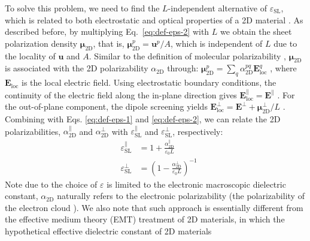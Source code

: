 \documentclass[journal=ancac3,manuscript=article,email=true,hyperref=true,keywords=false]{achemso}
\begin{document}
To solve this problem, we need to find the $L$-independent alternative
of $\varepsilon_{\mathrm{SL}}$, which is related to both electrostatic
and optical properties of a 2D material \cite{Matthes_2016}. As
described before, by multiplying Eq.~\ref{eq:def-eps-2} with $L$ we
obtain the sheet polarization density
$\boldsymbol{\mu}_{\mathrm{2D}}$, that is,
$\boldsymbol{\mu}_{\mathrm{2D}}^{p} =\boldsymbol{u}^{p}/A$, which is
independent of $L$ due to the locality of $\boldsymbol{u}$ and $A$.
%
Similar to the definition of molecular polarizability
\cite{Israelachvili_2011}, $\boldsymbol{\mu}_{\mathrm{2D}}$ is
associated with the 2D polarizability $\alpha_{\mathrm{2D}}$ through:
$\boldsymbol{\mu}_{\mathrm{2D}}^{p} = \sum_{q}
\alpha_{\mathrm{2D}}^{pq} \boldsymbol{E}_{\mathrm{loc}}^{q}$
\cite{T_bik_2004}, where $\boldsymbol{E}_{\mathrm{loc}}$ is the local
electric field. Using electrostatic boundary conditions, the
continuity of the electric field along the in-plane direction gives
$\boldsymbol{E}^{\parallel}_{\mathrm{loc}}=\boldsymbol{E}^{\parallel}$
\cite{Markel_2016}. For the out-of-plane component, the dipole
screening yields
$\boldsymbol{E}_{\mathrm{loc}}^{\perp}=\boldsymbol{E}^{\perp}+\boldsymbol{\mu}_{\mathrm{2D}}^{\perp}/L$
\cite{Meyer_2001_dipole_slab,T_bik_2004}. Combining with
Eqs. \ref{eq:def-eps-1} and \ref{eq:def-eps-2}, we can relate the 2D
polarizabilities, $\alpha_{\mathrm{2D}}^{\parallel}$ and
$\alpha_{\mathrm{2D}}^{\perp}$ with
$\varepsilon_{\mathrm{SL}}^{\parallel}$ and
$\varepsilon_{\mathrm{SL}}^{\perp}$, respectively:
%
%
\begin{subequations}
\begin{eqnarray}
  \label{eq:alpha-para-def}
  &\varepsilon_{\mathrm{SL}}^{\parallel} &= 1 + \frac{\alpha_{\mathrm{2D}}^{\parallel}}{\varepsilon_{0}L}\\
  \label{eq:alpha-perp-def}
  &\varepsilon_{\mathrm{SL}}^{\perp} &= \left(1 - {\displaystyle \frac{\alpha_{\mathrm{2D}}^{\perp}}{\varepsilon_{\mathrm{0}} L}} \right)^{-1}
\end{eqnarray}
\end{subequations}
Note due to the choice of $\varepsilon$ is limited to the electronic
macroscopic dielectric constant, $\alpha_{\mathrm{2D}}$ naturally
refers to the electronic polarizability (the polarizability of the
electron cloud \cite{Israelachvili_2011}). We also note that such
approach is essentially different from the effective medium theory
\cite{Aspnes_1982,Markel_2016} (EMT) treatment of 2D materials, in
which the hypothetical effective dielectric constant of 2D materials
\end{document}
